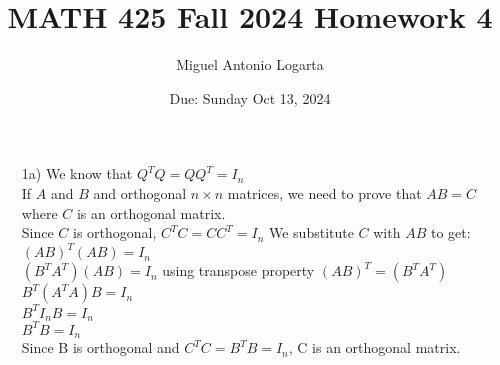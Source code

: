 \documentclass{article}
\title{MATH 425 Fall 2024 Homework 4}
\date{Due: Sunday Oct 13, 2024}
\author{Miguel Antonio Logarta}
\begin{document}
\maketitle  %
\thispagestyle{fancy}

\begin{enumerate}
    \item[1a)] We know that $Q^TQ = QQ^T = I_n$\\
    If $A$ and $B$ and orthogonal $n \times n$ matrices, we need to prove that $AB = C$ where $C$ is an orthogonal matrix.\\
    Since $C$ is orthogonal, $C^TC = CC^T = I_n$ 
    We substitute $C$ with $AB$ to get: \\
    $(AB)^T(AB) = I_n$\\
    $(B^TA^T)(AB) = I_n$ using transpose property $(AB)^T = (B^TA^T)$\\
    $B^T(A^TA)B = I_n$\\
    $B^TI_nB = I_n$\\
    $B^TB = I_n$\\
    Since B is orthogonal and $C^TC = B^TB = I_n$, C is an orthogonal matrix.
    

\end{enumerate}
\end{document}
